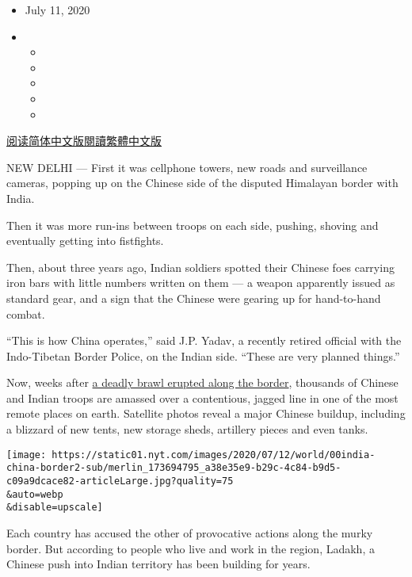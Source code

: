 \begin{itemize}
\item
  July 11, 2020
\item
  \begin{itemize}
  \item
  \item
  \item
  \item
  \item
  \end{itemize}
\end{itemize}

\href{https://cn.nytimes.com/world/20200713/india-china-border-ladakh/}{阅读简体中文版}\href{https://cn.nytimes.com/world/20200713/india-china-border-ladakh/zh-hant/}{閱讀繁體中文版}

NEW DELHI --- First it was cellphone towers, new roads and surveillance
cameras, popping up on the Chinese side of the disputed Himalayan border
with India.

Then it was more run-ins between troops on each side, pushing, shoving
and eventually getting into fistfights.

Then, about three years ago, Indian soldiers spotted their Chinese foes
carrying iron bars with little numbers written on them --- a weapon
apparently issued as standard gear, and a sign that the Chinese were
gearing up for hand-to-hand combat.

``This is how China operates,'' said J.P. Yadav, a recently retired
official with the Indo-Tibetan Border Police, on the Indian side.
``These are very planned things.''

Now, weeks after
\href{https://www.nytimes.com/2020/06/16/world/asia/indian-china-border-clash.html}{a
deadly brawl erupted along the border}, thousands of Chinese and Indian
troops are amassed over a contentious, jagged line in one of the most
remote places on earth. Satellite photos reveal a major Chinese buildup,
including a blizzard of new tents, new storage sheds, artillery pieces
and even tanks.

\texttt{[image: https://static01.nyt.com/images/2020/07/12/world/00india-china-border2-sub/merlin\_173694795\_a38e35e9-b29c-4c84-b9d5-c09a9dcace82-articleLarge.jpg?quality=75\\\&auto=webp\\\&disable=upscale]}

Each country has accused the other of provocative actions along the
murky border. But according to people who live and work in the region,
Ladakh, a Chinese push into Indian territory has been building for
years.

